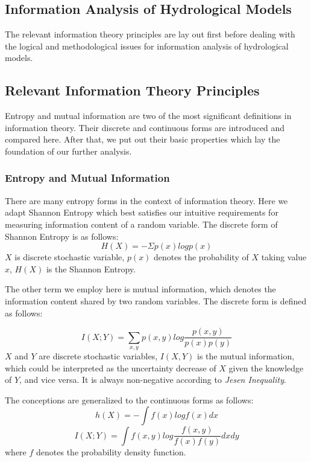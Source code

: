 \documentclass[11pt]{article}
\begin{document}
\iffalse
\newpage
\begin{center}
\section{Information Analysis of Hydrological Models} 
\end{center}

The relevant information theory principles are lay out first before dealing with the logical and methodological issues for information analysis of hydrological models.

\subsection{Relevant Information Theory Principles}
Entropy and mutual information are two of the most significant definitions in information theory. Their discrete and continuous forms are introduced and compared here. After that, we  put out their basic properties which lay the foundation of our further analysis.
\subsubsection{Entropy and Mutual Information}


There are many entropy forms in the context of information theory. Here we adapt Shannon Entropy which best satisfies our intuitive requirements for measuring information content of a random variable\cite{shannon2001mathematical}.
The discrete form of Shannon Entropy is as follows:
\begin{equation}
H(X)=-\Sigma p(x)logp(x)
\end{equation}
$X$ is discrete stochastic variable, $p(x)$ denotes the probability of $X$ taking  value $x$, $H(X)$ is the Shannon Entropy.

The other term we employ here is mutual information, which denotes the information content shared by two random variables. The discrete form is defined as follows:

\begin{equation}
I(X;Y)=\sum_{x,y}p(x,y)log\frac{p(x,y)}{p(x)p(y)}
\end{equation}
$X$ and $Y$ are discrete stochastic variables,
$I(X,Y)$ is the mutual information, which could be interpreted as the uncertainty decrease of $X$ given the knowledge of $Y$, and vice versa. It is always non-negative according to \emph{Jesen Inequality}\cite{cover2012elements}.

The conceptions are generalized to the continuous forms as follows:
\begin{equation}
h(X)=-\int f(x)logf(x)dx
\end{equation}
\begin{equation}
I(X;Y)=\int f(x,y)log\frac{f(x,y)}{f(x)f(y)}dxdy
\end{equation}
where $f$ denotes the probability density function.
\end{document}
